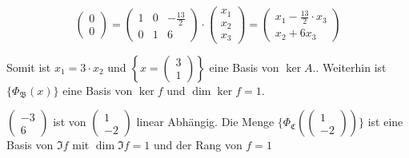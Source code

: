 \documentclass{article}
\begin{document}
\begin{enumerate}[1)]
  \[
    \begin{pmatrix}0\\0\end{pmatrix} = \begin{pmatrix}1&0&-\frac{13}{2}\\0&1&6\end{pmatrix} \cdot \begin{pmatrix}x_1\\x_2\\x_3\end{pmatrix} =
    \begin{pmatrix}x_1 - \frac{13}{2}\cdot x_3\\x_2 + 6x_3\end{pmatrix}
  \]

  Somit ist $x_1 = 3 \cdot x_2$ und $\left\{ x = \begin{pmatrix}3\\1\end{pmatrix}\right\}$ eine Basis von $\ker A.$.
  Weiterhin ist $\{ \Phi_\mathfrak{B}(x)\}$  eine Basis von $\ker f$ und $\dim \ker f = 1$.
  
  $\begin{pmatrix}-3\\6\end{pmatrix}$ ist von $\begin{pmatrix}1\\-2\end{pmatrix}$ linear Abhängig.
  Die Menge $\{ \Phi_\mathfrak{C}(\begin{pmatrix}1\\-2\end{pmatrix})\}$ ist eine Basis von $\Im f$ mit $\dim \Im f = 1$ und
  der Rang von $f = 1$ 
\end{enumerate}
  
\end{document}
